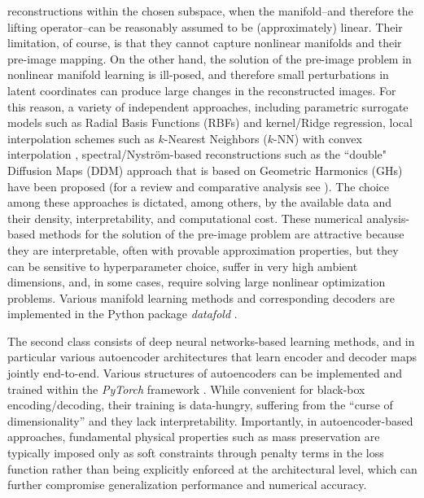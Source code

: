 \documentclass{article}
\begin{document}
reconstructions within the chosen subspace, when the manifold--and therefore the lifting operator--can be reasonably assumed to be (approximately) linear. Their limitation, of course, is that they cannot capture nonlinear manifolds and their pre-image mapping. On the other hand, the solution of the pre-image problem in nonlinear manifold learning is ill-posed, and therefore small perturbations in latent coordinates can produce large changes in the reconstructed images. For this reason, a variety of independent approaches, including parametric surrogate models such as Radial Basis Functions (RBFs) and kernel/Ridge regression, local interpolation schemes such as $k$-Nearest Neighbors ($k$-NN) with convex interpolation \cite{fix1985discriminatory,Patsatzis_2023}, spectral/Nystr\"{o}m-based reconstructions such as the ``double" Diffusion Maps (DDM) approach that is based on Geometric Harmonics (GHs) \cite{coifman2006geometric,evangelou2022double} have been proposed (for a review and comparative analysis see \cite{chiavazzo2014reduced,papaioannou2022time}). The choice among these approaches is dictated, among others, by the available data and their density, interpretability, and computational cost. These numerical analysis-based methods for the solution of the pre-image problem are attractive because they are interpretable, often with provable approximation properties, but they can be sensitive to hyperparameter choice, suffer in very high ambient dimensions, and, in some cases, require solving large nonlinear optimization problems. Various manifold learning methods and corresponding decoders are implemented in the Python package \textit{datafold}  \cite{lehmberg2020datafold}.

The second class consists of deep neural networks-based learning methods, and in particular various autoencoder architectures \cite{hinton2006reducing,masci2011stacked,vlachas2022multiscale,romor2023non, peterfreund2020local} that learn encoder and decoder maps jointly end-to-end.
Various structures of autoencoders can be implemented and trained within the \textit{PyTorch} framework \cite{paszke2019pytorch}. While convenient for black-box encoding/decoding, their training is data-hungry, suffering from the ``curse of dimensionality” and they lack interpretability. Importantly, in autoencoder-based approaches, fundamental physical properties such as mass preservation are typically imposed only as soft constraints through penalty terms in the loss function rather than being explicitly enforced at the architectural level, which can further compromise generalization performance and numerical accuracy. 
\end{document}
